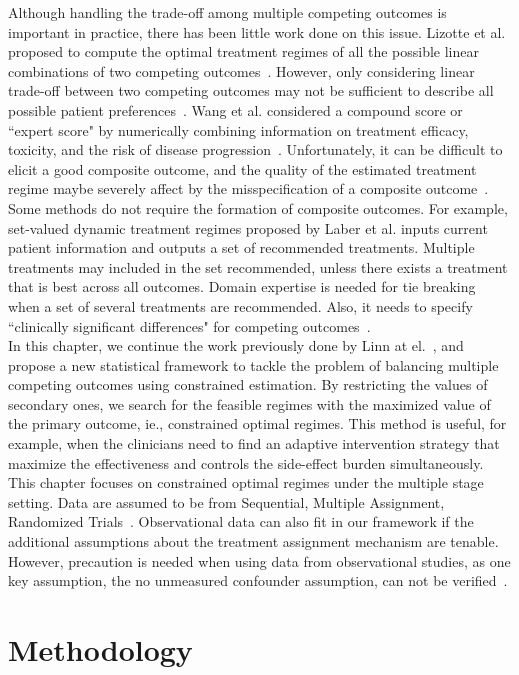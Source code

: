 \documentclass{article}
\begin{document}
Although handling the trade-off among multiple competing outcomes is important in practice, there has been little work done on this issue.  Lizotte et al. proposed to compute the optimal treatment regimes of all the possible linear combinations of two competing outcomes~\cite{Lizotte2010}. However, only considering linear trade-off between two competing outcomes may not be sufficient to describe all possible patient preferences~\cite{LaberTwo2014}. Wang et al. considered a compound score or ``expert score" by numerically combining information on treatment efficacy, toxicity, and the risk of disease progression~\cite{Wang2012}. Unfortunately, it can be difficult to elicit a good composite outcome, and the quality of the estimated treatment regime maybe severely affect by the misspecification of a composite outcome~\cite{Laber2014}. Some methods do not require the formation of composite outcomes. For example, set-valued dynamic treatment regimes proposed by Laber et al. inputs current patient information and outputs a set of recommended treatments. Multiple treatments may included in the set recommended, unless there exists a treatment that is best across all outcomes. Domain expertise is needed for tie breaking when a set of several treatments are recommended. Also, it needs to specify ``clinically significant differences" for competing outcomes~\cite{LaberTwo2014}. \\

In this chapter, we continue the work previously done by Linn at el.~\cite{constrained}, and propose a new statistical framework to tackle the problem of balancing multiple competing outcomes using constrained estimation. By restricting the values of secondary ones, we search for the feasible regimes with the maximized value of the primary outcome, ie., constrained optimal regimes. This method is useful, for example, when the clinicians need to find an adaptive intervention strategy that maximize the effectiveness and controls the side-effect burden simultaneously. This chapter focuses on constrained optimal regimes under the multiple stage setting. Data are assumed to be from Sequential, Multiple Assignment, Randomized Trials~\cite{Lei2012}. Observational data can also fit in our framework if the additional assumptions about the treatment assignment mechanism are tenable. However, precaution is needed when using data from observational studies, as one key assumption, the no unmeasured confounder assumption, can not be verified~\cite{Chakraborty2013}. 

\section{Methodology}
\end{document}
